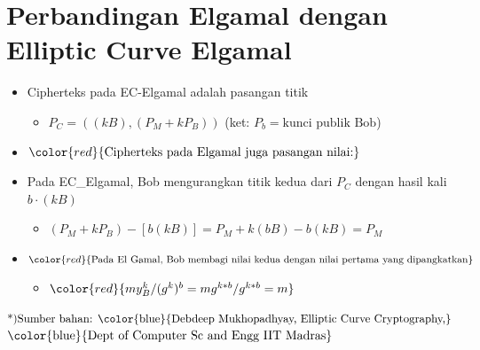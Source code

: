 \documentclass{article}
\begin{document}

\section*{Perbandingan Elgamal dengan Elliptic Curve Elgamal}

\begin{itemize}
    \item Cipherteks pada EC-Elgamal adalah pasangan titik
    \begin{itemize}
        \item $P_C = ( (kB), (P_M + kP_B) )$ \quad (ket: $P_b = \text{kunci publik Bob}$)
    \end{itemize}
    
    \item $\color{red}{\text{Cipherteks pada Elgamal juga pasangan nilai:}}$
\end{itemize}

\hrulefill

\begin{itemize}
    \item Pada EC\_Elgamal, Bob mengurangkan titik kedua dari $P_C$ dengan hasil kali $b \cdot (kB)$
    \begin{itemize}
        \item $(P_M + kP_B) - [b(kB)] = P_M + k(bB) - b(kB) = P_M$
    \end{itemize}
    
    \item $$
    \begin{itemize}
        \item $$
    \end{itemize}
\end{itemize}

\vspace{10mm}

\begin{flushright}
\small $\text{*)}  \text{\color{blue}{Debdeep Mukhopadhyay, Elliptic Curve Cryptography,}}$ \\
\small $\text{\color{blue}{Dept of Computer Sc and Engg IIT Madras}}$
\end{flushright}
\end{document}
